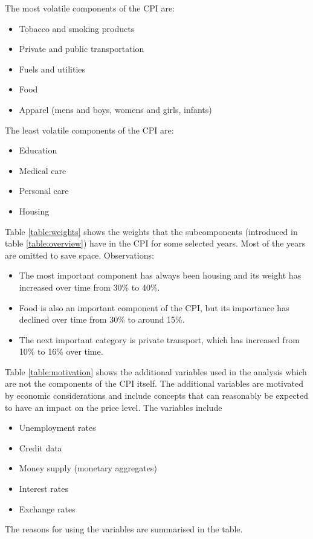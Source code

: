 \documentclass[12pt]{article}
\begin{document}
The most volatile components of the CPI are: 
\begin{itemize}
\item Tobacco and smoking products
\item Private and public transportation
\item Fuels and utilities 
\item Food
\item Apparel (mens and boys, womens and girls, infants)
\end{itemize}


The least volatile components of the CPI are: 
\begin{itemize}
\item Education
\item Medical care
\item Personal care
\item Housing
\end{itemize}

Table \ref{table:weights} shows the weights that the subcomponents (introduced in table \ref{table:overview}) have in the CPI for some selected years. Most of the years are omitted to save space. 
Observations:
\begin{itemize}
\item The most important component has always been housing and its weight has increased over time from 30\% to 40\%. 
\item Food is also an important component of the CPI, but its importance has declined over time from 30\% to around 15\%. 
\item The next important category is private transport, which has increased from 10\% to 16\% over time. 
\end{itemize}


Table \ref{table:motivation} shows the additional variables used in the analysis which are not the components of the CPI itself. The additional variables are motivated by economic considerations and include concepts that can reasonably be expected to have an impact on the price level. The variables include
\begin{itemize}
\item Unemployment rates
\item Credit data
\item Money supply (monetary aggregates)
\item Interest rates
\item Exchange rates
\end{itemize}
The reasons for using the variables are summarised in the table.
\end{document}
